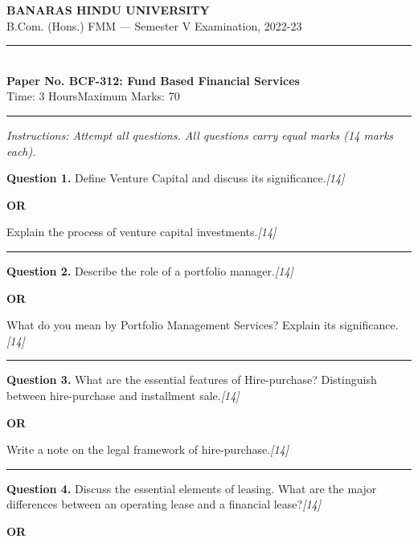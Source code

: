 \documentclass[11pt,a4paper]{article}
\newcommand{\pts}[1]{\hfill   \textit{[#1]}}
\begin{document}
\begin{center}
  {\large\bfseries BANARAS HINDU UNIVERSITY}\\[2pt]
  {\normalsize B.Com. (Hons.) FMM --- Semester V Examination, 2022-23}\\[6pt]
  \rule{0.8\linewidth}{0.5pt}\\[6pt]
  {\large\bfseries Paper No. BCF-312: Fund Based Financial Services}\\[4pt]
  {\normalsize Time: 3 Hours\hfill Maximum Marks: 70}
\end{center}

\rule{\linewidth}{0.4pt}

\smallskip



\noindent   \textit{Instructions: Attempt all questions. All questions carry equal marks (14 marks each).}

\bigskip




\noindent   \textbf{Question 1.}
Define Venture Capital and discuss its significance.\pts{14}

\centerline{   \textbf{OR}}

Explain the process of venture capital investments.\pts{14}

\medskip\rule{\linewidth}{0.2pt}




\noindent   \textbf{Question 2.}
Describe the role of a portfolio manager.\pts{14}

\centerline{   \textbf{OR}}

What do you mean by Portfolio Management Services? Explain its significance.\pts{14}

\medskip\rule{\linewidth}{0.2pt}




\noindent   \textbf{Question 3.}
What are the essential features of Hire-purchase? Distinguish between hire-purchase and installment sale.\pts{14}

\centerline{   \textbf{OR}}

Write a note on the legal framework of hire-purchase.\pts{14}

\medskip\rule{\linewidth}{0.2pt}




\noindent   \textbf{Question 4.}
Discuss the essential elements of leasing. What are the major differences between an operating lease and a financial lease?\pts{14}

\centerline{   \textbf{OR}}
\end{document}
